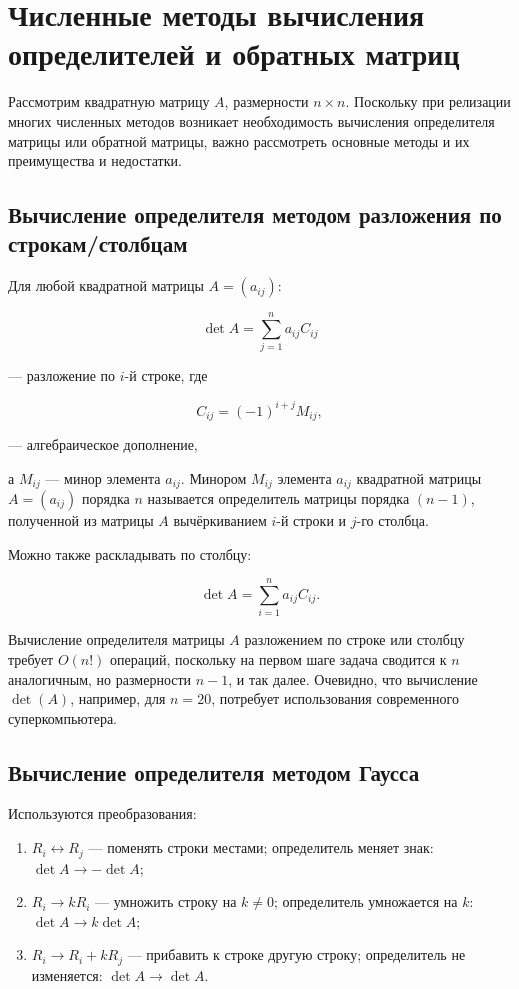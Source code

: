 \section{Численные методы вычисления определителей и обратных матриц}
\label{sec:determinants-and-inverse-matrices}

Рассмотрим квадратную матрицу $A$, размерности $n \times n$. Поскольку при релизации многих численных методов возникает необходимость вычисления определителя матрицы или обратной матрицы, важно рассмотреть основные методы и их преимущества и недостатки.

\subsection{Вычисление определителя методом разложения по строкам/столбцам}

Для любой квадратной матрицы $A=(a_{ij})$:

\[
\det A=\sum_{j=1}^{n}a_{ij}C_{ij}
\]

— разложение по $i$-й строке, где

\[
C_{ij}=(-1)^{i+j}M_{ij},
\]

— алгебраическое дополнение,

а $M_{ij}$ — минор элемента $a_{ij}$. Минором $M_{ij}$ элемента $a_{ij}$ квадратной матрицы $A=(a_{ij})$ порядка $n$ называется определитель матрицы порядка $(n-1)$, полученной из матрицы $A$ вычёркиванием $i$-й строки и $j$-го столбца.

Можно также раскладывать по столбцу:

\[
\det A=\sum_{i=1}^{n}a_{ij}C_{ij}.
\]

Вычисление определителя матрицы $A$ разложением по строке или столбцу требует $O(n!)$ операций, поскольку на первом шаге задача сводится к $n$ аналогичным, но размерности $n-1$, и так далее. Очевидно, что вычисление $\det(A)$, например, для $n = 20$, потребует использования современного суперкомпьютера.

\subsection{Вычисление определителя методом Гаусса}

Используются преобразования:

\begin{enumerate}
	\item $R_i \leftrightarrow R_j$ — поменять строки местами; 
	\quad определитель меняет знак: $\det A \to -\det A$;
	
	\item $R_i \to kR_i$ — умножить строку на $k \neq 0$; 
	\quad определитель умножается на $k$: $\det A \to k\det A$;
	
	\item $R_i \to R_i + kR_j$ — прибавить к строке другую строку; 
	\quad определитель не изменяется: $\det A \to \det A$.
\end{enumerate}

